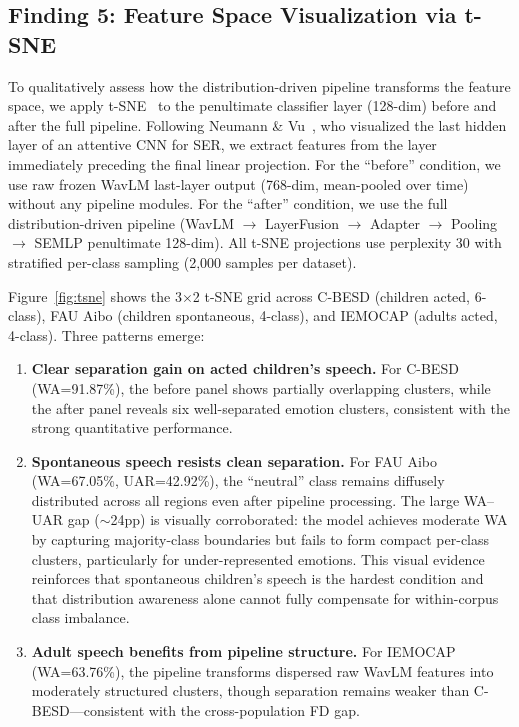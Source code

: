 \subsection{Finding 5: Feature Space Visualization via t-SNE}

To qualitatively assess how the distribution-driven pipeline transforms the
feature space, we apply t-SNE~\cite{van2008visualizing} to the penultimate
classifier layer (128-dim) before and after the full pipeline. Following
Neumann \& Vu~\cite{neumann2019cross}, who visualized the last hidden layer
of an attentive CNN for SER, we extract features from the layer immediately
preceding the final linear projection. For the ``before'' condition, we use
raw frozen WavLM last-layer output (768-dim, mean-pooled over time) without
any pipeline modules. For the ``after'' condition, we use the full
distribution-driven pipeline (WavLM $\rightarrow$ LayerFusion $\rightarrow$
Adapter $\rightarrow$ Pooling $\rightarrow$ SEMLP penultimate 128-dim).
All t-SNE projections use perplexity 30 with stratified per-class sampling
(2,000 samples per dataset).

Figure~\ref{fig:tsne} shows the 3$\times$2 t-SNE grid across C-BESD
(children acted, 6-class), FAU Aibo (children spontaneous, 4-class), and
IEMOCAP (adults acted, 4-class). Three patterns emerge:

\begin{enumerate}
    \item \textbf{Clear separation gain on acted children's speech.}
    For C-BESD (WA=91.87\%), the before panel shows partially overlapping
    clusters, while the after panel reveals six well-separated emotion
    clusters, consistent with the strong quantitative performance.

    \item \textbf{Spontaneous speech resists clean separation.}
    For FAU Aibo (WA=67.05\%, UAR=42.92\%), the ``neutral'' class remains
    diffusely distributed across all regions even after pipeline processing.
    The large WA--UAR gap ($\sim$24pp) is visually corroborated: the model
    achieves moderate WA by capturing majority-class boundaries but fails
    to form compact per-class clusters, particularly for under-represented
    emotions. This visual evidence reinforces that spontaneous children's
    speech is the hardest condition and that distribution awareness alone
    cannot fully compensate for within-corpus class imbalance.

    \item \textbf{Adult speech benefits from pipeline structure.}
    For IEMOCAP (WA=63.76\%), the pipeline transforms dispersed raw WavLM
    features into moderately structured clusters, though separation remains
    weaker than C-BESD---consistent with the cross-population FD gap.
\end{enumerate}

